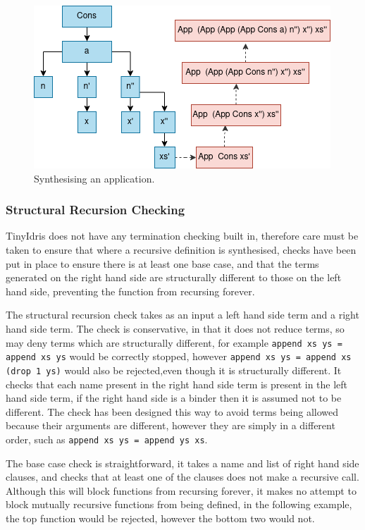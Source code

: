 \documentclass[a4paper]{article}
\begin{document}
\begin{center}
\begin{figure}[htbp]
\centering
\includegraphics[scale=0.6]{./Resource/tis.png}
\caption{Synthesising an application.}
\end{figure}
\end{center}

\clearpage

\subsubsection{Structural Recursion Checking}
\label{sec:orgb4d20b2}
TinyIdris does not have any termination checking built in,
therefore care must be taken to ensure that where a recursive
definition is synthesised, checks have been put in place to
ensure there is at least one base case, and that the terms
generated on the right hand side are structurally different to those
on the left hand side, preventing the function from recursing forever. 

The structural recursion check takes as an input a
left hand side term and a right hand side term. The check is
conservative, in that it does not reduce terms, so may deny terms
which are structurally different, for example
\texttt{append xs ys = append xs ys} would be correctly stopped, however \texttt{append xs ys = append xs (drop 1 ys)} would also be rejected,even though it is structurally different. It checks that each name
present in the right hand side term is present in the left hand side
term, if the right hand side is a binder then it is assumed not to
be different. The check has been designed this way to avoid terms
being allowed because their arguments are different, however they
are simply in a different order, such as
\texttt{append xs ys = append ys xs}.  	

The base case check is straightforward, it takes a name and list of
right hand side clauses, and checks that at least one of the clauses
does not make a recursive call. Although this will block functions from
recursing forever, it makes no attempt to block mutually recursive
functions from being defined, in the following example, the top function
would be rejected, however the bottom two would not.
\end{document}
